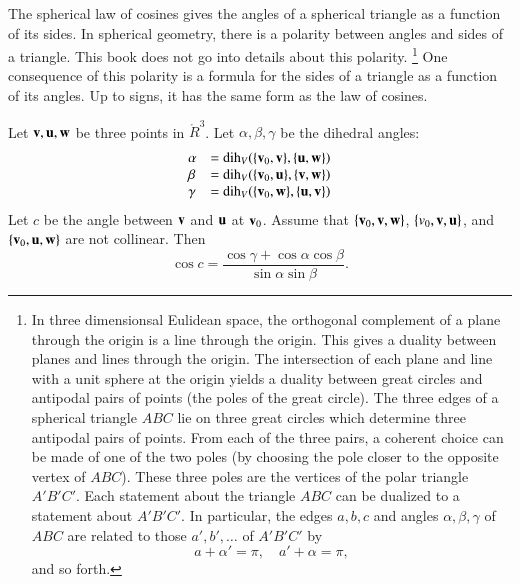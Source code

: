 The spherical law of cosines gives the angles of a spherical triangle
as a function of its sides.  In spherical geometry, there is a
polarity between angles and sides of a triangle.  This book does not
go into details about this polarity.%
\footnote{In three dimensionsal Eulidean space, the orthogonal
  complement of a plane through the origin is a line through the
  origin.  This gives a duality between planes and lines through the
  origin.  The intersection of each plane and line with a unit sphere
  at the origin yields a duality between great circles and antipodal
  pairs of points (the poles of the great circle).  The three edges of
  a spherical triangle $ABC$ lie on three great circles which
  determine three antipodal pairs of points.  From each of the three
  pairs, a coherent choice can be made of one of the two poles (by
  choosing the pole closer to the opposite vertex of $ABC$).  These
  three poles are the vertices of the polar triangle $A'B'C'$.  Each
  statement about the triangle $ABC$ can be dualized to a statement
  about $A'B'C'$.  In particular, the edges $a,b,c$ and angles
  $\alpha,\beta,\gamma$ of $ABC$ are related to those $a',b',\ldots$
  of $A'B'C'$ by
\begin{displaymath}
a + \alpha' = \pi,\quad a' + \alpha= \pi,
\end{displaymath}
and so forth.
}  %
One
consequence of this polarity is a formula for the sides of
a triangle as a function of its angles.  Up to signs,
it has the same form as the law of cosines.
%

\begin{lemma}
\label{lemma:sloc2}  Let
  ${\mathbf v},{\mathbf u},{\mathbf w}$ be three points in $\ring{R}^3$.  Let
  $\alpha,\beta,\gamma$ be the dihedral angles:
\begin{displaymath}
\begin{array}{lll}
\alpha &= \operatorname{dih}_V(\{{\mathbf v}_0,{\mathbf v}\},\{{\mathbf u},{\mathbf w}\})\\
\beta &= \operatorname{dih}_V(\{{\mathbf v}_0,{\mathbf u}\},\{{\mathbf v},{\mathbf w}\})\\
\gamma&= \operatorname{dih}_V(\{{\mathbf v}_0,{\mathbf w}\},\{{\mathbf u},{\mathbf v}\})\\
\end{array}
\end{displaymath}
Let $c$ be the
angle between ${\mathbf v}$ and ${\mathbf u}$ at ${\mathbf v}_0$. 
Assume that $\{{\mathbf v}_0,{\mathbf v},{\mathbf w}\}$, $\{v_0,{\mathbf v},{\mathbf u}\}$, and $\{{\mathbf v}_0,{\mathbf u},{\mathbf w}\}$ are not collinear.
Then
\begin{displaymath}
\cos c = \frac{\cos \gamma + \cos \alpha \cos \beta}
{\sin \alpha\sin \beta}.
\end{displaymath}
\end{lemma}
%
%

